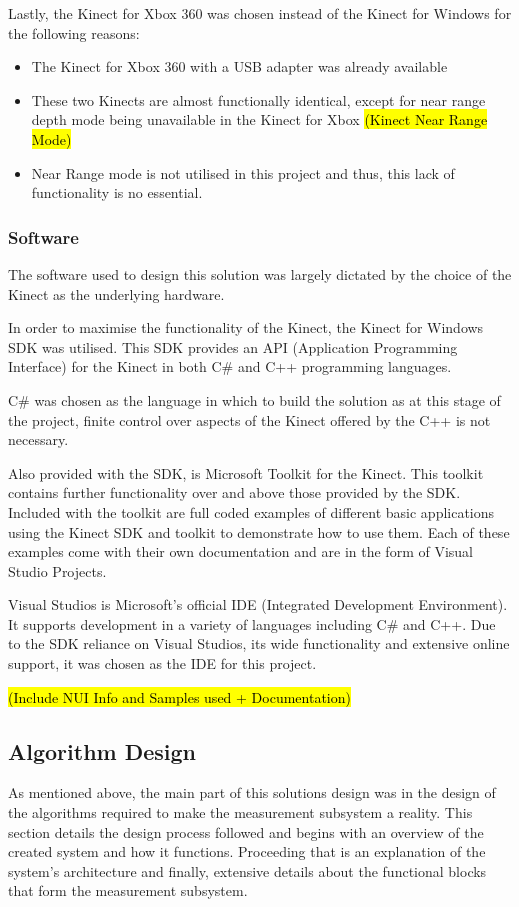 Lastly, the Kinect for Xbox 360 was chosen instead of the Kinect for Windows for the following reasons:

\begin{itemize}
	\item The Kinect for Xbox 360 with a USB adapter was already available
	\item These two Kinects are almost functionally identical, except for near range depth mode being unavailable in the Kinect for Xbox \hl{(Kinect Near Range Mode)}
	\item Near Range mode is not utilised in this project and thus, this lack of functionality is no essential.
\end{itemize}

\subsubsection{Software}
The software used to design this solution was largely dictated by the choice of the Kinect as the underlying hardware. 

In order to maximise the functionality of the Kinect, the Kinect for Windows SDK was utilised. This SDK provides an API (Application Programming Interface) for the Kinect in both C\# and C++ programming languages. 

C\# was chosen as the language in which to build the solution as at this stage of the project, finite control over aspects of the Kinect offered by the C++ is not necessary. 

Also provided with the SDK, is Microsoft Toolkit for the Kinect. This toolkit contains further functionality over and above those provided by the SDK. Included with the toolkit are full coded examples of different basic applications using the Kinect SDK and toolkit to demonstrate how to use them. Each of these examples come with their own documentation and are in the form of Visual Studio Projects.

Visual Studios is Microsoft's official IDE (Integrated Development Environment). It supports development in a variety of languages including C\# and C++. Due to the SDK reliance on Visual Studios, its wide functionality and extensive online support, it was chosen as the IDE for this project. 

\hl{(Include NUI Info and Samples used + Documentation)}

\subsection{Algorithm Design}
As mentioned above, the main part of this solutions design was in the design of the algorithms required to make the measurement subsystem a reality. This section details the design process followed and begins with an overview of the created system and how it functions. Proceeding that is an explanation of the system's architecture and finally, extensive details about the functional blocks that form the measurement subsystem. 

